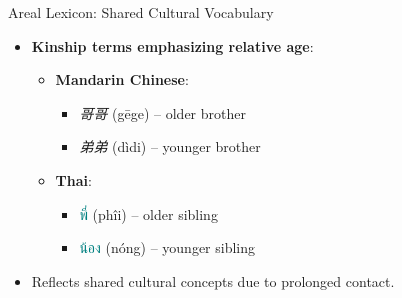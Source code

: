 \documentclass{beamer}
\newcommand{\mtplain}[1]{\textcolor{teal}{#1}}
\newcommand{\tha}[1]{\mtplain{\textthai{#1}}}
\begin{document}
\begin{frame}[allowframebreaks]{Areal Lexicon: Shared Cultural Vocabulary}
\begin{itemize}
                  \framebreak
        \item \textbf{Kinship terms emphasizing relative age}:
            \begin{itemize}
                \item \textbf{Mandarin Chinese}:
                    \begin{itemize}
                        \item \textit{哥哥} (gēge) – older brother
                        \item \textit{弟弟} (dìdi) – younger brother
                    \end{itemize}
                \item \textbf{Thai}:
                    \begin{itemize}
                        \item \tha{พี่} (phîi) – older sibling
                        \item \tha{น้อง} (nóng) – younger sibling
                    \end{itemize}
            \end{itemize}
        \item Reflects shared cultural concepts due to prolonged contact.
    \end{itemize}
\end{frame}
\end{document}

